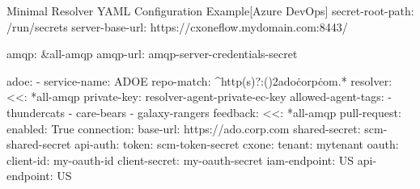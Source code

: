 \begin{code}{Minimal Resolver YAML Configuration Example}{[Azure DevOps]}{}
  secret-root-path: /run/secrets
  server-base-url: https://cxoneflow.mydomain.com:8443/

  amqp: &all-amqp
    amqp-url: amqp-server-credentials-secret

  adoe:
      - service-name: ADOE
        repo-match: ^http(s)?:(\/){2}ado\.corp\.com.*
        resolver:
          <<: *all-amqp
          private-key: resolver-agent-private-ec-key
          allowed-agent-tags:
            - thundercats
            - care-bears
            - galaxy-rangers
      feedback:
          <<: *all-amqp
          pull-request:
            enabled: True
        connection:
          base-url: https://ado.corp.com
          shared-secret: scm-shared-secret
          api-auth:
            token: scm-token-secret
        cxone:
          tenant: mytenant
          oauth:
            client-id: my-oauth-id
            client-secret: my-oauth-secret
          iam-endpoint: US
          api-endpoint: US
\end{code}
